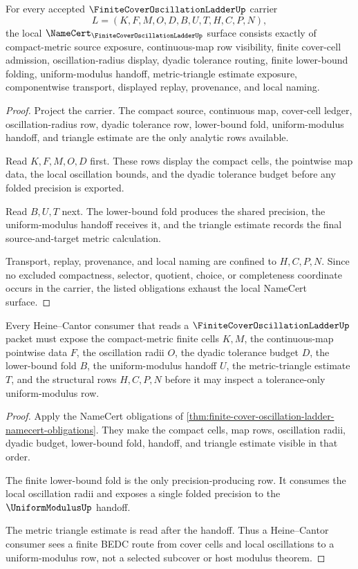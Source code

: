 \begin{theorem}
\label{thm:finite-cover-oscillation-ladder-namecert-obligations}
For every accepted $\FiniteCoverOscillationLadderUp$ carrier
$$
L=(K,F,M,O,D,B,U,T,H,C,P,N),
$$
the local $\NameCert_{\FiniteCoverOscillationLadderUp}$ surface consists exactly of compact-metric source exposure, continuous-map row visibility, finite cover-cell admission, oscillation-radius display, dyadic tolerance routing, finite lower-bound folding, uniform-modulus handoff, metric-triangle estimate exposure, componentwise transport, displayed replay, provenance, and local naming.
\end{theorem}
\begin{proof}
Project the carrier. The compact source, continuous map, cover-cell ledger, oscillation-radius row, dyadic tolerance row, lower-bound fold, uniform-modulus handoff, and triangle estimate are the only analytic rows available.

Read $K,F,M,O,D$ first. These rows display the compact cells, the pointwise map data, the local oscillation bounds, and the dyadic tolerance budget before any folded precision is exported.

Read $B,U,T$ next. The lower-bound fold produces the shared precision, the uniform-modulus handoff receives it, and the triangle estimate records the final source-and-target metric calculation.

Transport, replay, provenance, and local naming are confined to $H,C,P,N$. Since no excluded compactness, selector, quotient, choice, or completeness coordinate occurs in the carrier, the listed obligations exhaust the local NameCert surface.
\end{proof}

\begin{theorem}
\label{thm:finite-cover-oscillation-ladder-heine-cantor-route}
Every Heine--Cantor consumer that reads a $\FiniteCoverOscillationLadderUp$ packet must expose the compact-metric finite cells $K,M$, the continuous-map pointwise data $F$, the oscillation radii $O$, the dyadic tolerance budget $D$, the lower-bound fold $B$, the uniform-modulus handoff $U$, the metric-triangle estimate $T$, and the structural rows $H,C,P,N$ before it may inspect a tolerance-only uniform-modulus row.
\end{theorem}
\begin{proof}
Apply the NameCert obligations of \autoref{thm:finite-cover-oscillation-ladder-namecert-obligations}. They make the compact cells, map rows, oscillation radii, dyadic budget, lower-bound fold, handoff, and triangle estimate visible in that order.

The finite lower-bound fold is the only precision-producing row. It consumes the local oscillation radii and exposes a single folded precision to the $\UniformModulusUp$ handoff.

The metric triangle estimate is read after the handoff. Thus a Heine--Cantor consumer sees a finite BEDC route from cover cells and local oscillations to a uniform-modulus row, not a selected subcover or host modulus theorem.
\end{proof}

